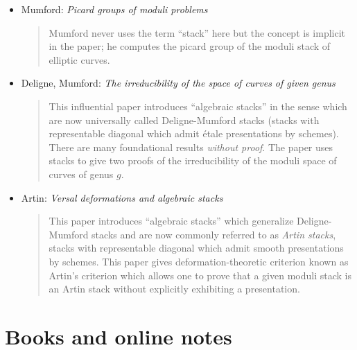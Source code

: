 \begin{itemize}
\item Mumford: \emph{Picard groups of moduli problems}
\cite{mumford_picard}
\begin{quote}
Mumford never uses the term ``stack'' here but the
concept is implicit in the paper; he computes the picard group of the moduli
stack of elliptic curves.
\end{quote}
\item Deligne, Mumford: \emph{The irreducibility of the space of curves of
given genus} \cite{DM}
\begin{quote}
This influential paper introduces ``algebraic stacks'' in the
sense which are now universally called Deligne-Mumford stacks (stacks with
representable diagonal which admit \'etale presentations by schemes). There
are many foundational results \emph{without proof}. The paper uses stacks to
give two proofs of the irreducibility of the moduli space of curves of genus
$g$.
\end{quote}
\item Artin: \emph{Versal deformations and algebraic stacks}
\cite{ArtinVersal}
\begin{quote}
This paper introduces ``algebraic stacks'' which generalize Deligne-Mumford
stacks and are now commonly referred to as \emph{Artin stacks}, stacks with
representable diagonal which admit smooth presentations by schemes.
This paper gives deformation-theoretic criterion known as Artin's criterion
which allows one to prove that a given moduli stack is an Artin stack without
explicitly exhibiting a presentation.
\end{quote}
\end{itemize}




\section{Books and online notes}
\label{section-books}


